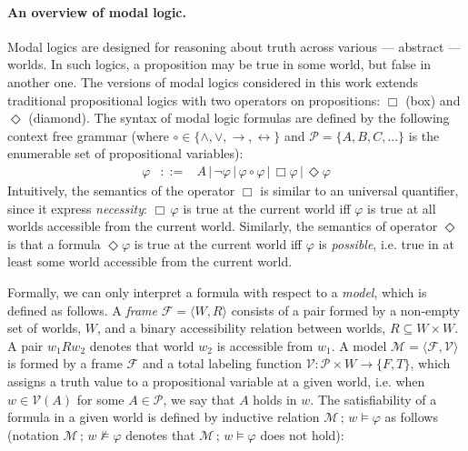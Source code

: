 \documentclass[sigconf]{acmart}
\begin{document}
\paragraph{An overview of modal logic.} Modal logics are designed for reasoning
about truth across various --- abstract --- worlds. In such logics, a
proposition may be true in some world, but false in another one. The versions of
modal logics considered in this work extends traditional propositional logics
with two operators on propositions: $\Box$ (box) and $\Diamond$ (diamond).
The syntax of modal logic formulas are defined by the following context free
grammar (where $\circ \in\{\land,\lor,\to,\leftrightarrow\}$ and
$\mathcal{P} = \{A,B,C,...\}$ is the enumerable set of propositional variables):
\[
  \begin{array}{lcl}
    \varphi & ::= & A\,|\,\neg\varphi\,|\,\varphi\circ\varphi\,|\,\Box\varphi\,|\,\Diamond\varphi
  \end{array}  
\]
Intuitively, the semantics of the operator $\Box$ is similar to an universal
quantifier, since it express \emph{necessity}: $\Box\,\varphi$ is true at the
current world iff $\varphi$ is true at all worlds accessible from the current
world. Similarly, the semantics of operator
$\Diamond$ is that a formula $\Diamond\varphi$ is true at the current
world iff $\varphi$ is \emph{possible}, i.e. true in at least some world
accessible from the current world.

Formally, we can only interpret a formula with respect to a \emph{model}, which is
defined as follows.
A \emph{frame} $\mathcal{F} = \langle W, R \rangle$ consists of a pair formed by
a non-empty set of worlds, $W$, and a binary accessibility relation between
worlds, $R \subseteq W \times W$. A pair $w_1Rw_2$ denotes that world $w_2$ is
accessible from $w_1$. A model $\mathcal{M} = \langle \mathcal{F}, \mathcal{V} \rangle$
is formed by a frame $\mathcal{F}$ and a total labeling function
$\mathcal{V} : \mathcal{P}\times W\to \{F,T\}$, which assigns
a truth value to a propositional variable at a given world, i.e. when $w \in \mathcal{V}(A)$
for some $A \in\mathcal{P}$, we say that $A$ holds in $w$. The satisfiability of a formula
in a given world is defined by inductive relation $\mathcal{M}\,;\,w\models \varphi$ as
follows (notation $\mathcal{M}\,;\,w\not\models \varphi$ denotes
that $\mathcal{M}\,;\,w\models \varphi$ does not hold):
\end{document}
